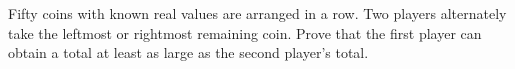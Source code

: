 Fifty coins with known real values are arranged in a row. Two players alternately take the leftmost or rightmost remaining coin. Prove that the first player can obtain a total at least as large as the second player's total.
